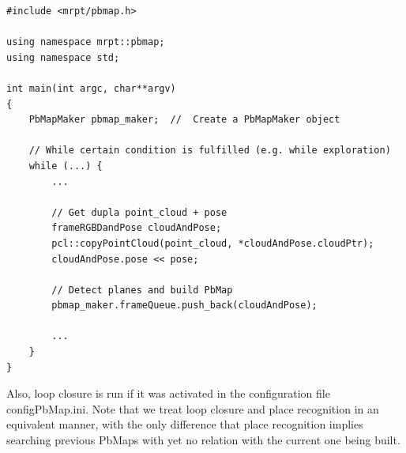 \documentclass[a4paper,11pt]{article}
\begin{document}
\begin{lstlisting}
#include <mrpt/pbmap.h>

using namespace mrpt::pbmap;
using namespace std;

int main(int argc, char**argv)
{
	PbMapMaker pbmap_maker;  //  Create a PbMapMaker object
	
	// While certain condition is fulfilled (e.g. while exploration)
	while (...) {
		...

		// Get dupla point_cloud + pose
		frameRGBDandPose cloudAndPose;
		pcl::copyPointCloud(point_cloud, *cloudAndPose.cloudPtr);
		cloudAndPose.pose << pose;

		// Detect planes and build PbMap
		pbmap_maker.frameQueue.push_back(cloudAndPose);

		...
	}
}
\end{lstlisting}

Also, loop closure is run if it was activated in the configuration file  configPbMap.ini. Note that we treat loop closure and place recognition in an equivalent manner, with the only difference that place recognition implies searching previous PbMaps with yet no relation with the current one being built.




\end{document}
